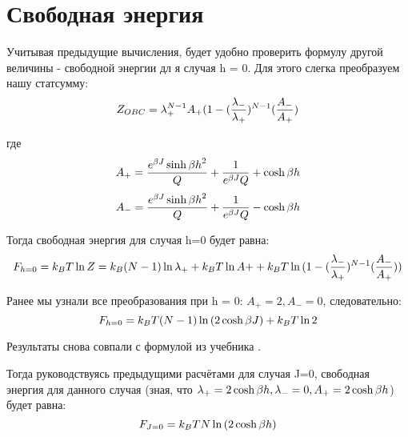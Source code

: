 \section{Свободная энергия}
Учитывая предыдущие вычисления, будет удобно проверить формулу другой величины - свободной энергии дл 
я случая h = 0. Для этого слегка преобразуем нашу статсумму:
\[ Z_{OBC} = \lambda_{+}^{N-1}A_{+}(1 - (\frac{\lambda_{-}}{\lambda_{+}})^{N-1}(\frac{A_{-}}{A_{+}}) \]

где \[ A_{+} = \frac{e^{\beta J} \sinh{\beta h}^2}{Q} + \frac{1}{e^{\beta J}Q} +  \cosh{\beta h}\]
\[ A_{-} = \frac{e^{\beta J} \sinh{\beta h}^2}{Q} + \frac{1}{e^{\beta J}Q} -  \cosh{\beta h}\]

Тогда свободная энергия для случая h=0 будет равна:
\[ F_{h=0} = k_{B}T\ln{Z} =  k_{B}(N-1)\ln{\lambda_{+}} + k_{B}T\ln{A+} + k_{B}T\ln{(1 - (\frac{\lambda_{-}}{\lambda_{+}})^{N-1}(\frac{A_{-}}{A_{+}}))}\]

Ранее мы узнали все преобразования при h = 0: $A_{+} = 2, A_{-} = 0$, следовательно:
\[ F_{h=0} = k_{B}T(N-1)\ln{(2\cosh{\beta J})} + k_{B}T\ln{2}\]

Результаты снова совпали с формулой из учебника \cite{Swen}.

Тогда руководствуясь предыдущими расчётами для случая J=0, свободная энергия для данного случая (зная, что $\lambda_{+} = 2\cosh{\beta h}, \lambda_{-} = 0, A_{+} = 2\cosh{\beta h}$) будет равна:
\[ F_{J=0} = k_{B}T N \ln{(2\cosh{\beta h})}\]